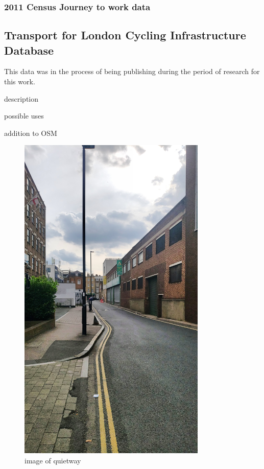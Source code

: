 \documentclass[11pt]{article} %
\begin{document}
\subsubsection{2011 Census Journey to work data}

\subsection{Transport for London Cycling Infrastructure Database}

This data was in the process of being publishing during the period of research for this work. 

description

possible uses

addition to OSM

\begin{figure}
\centering
\includegraphics[width=0.8\textwidth]{brandon_rd}
\caption{image of quietway}
\end{figure}
\end{document}
